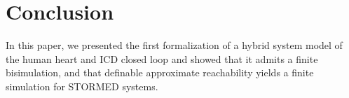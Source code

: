 \section{Conclusion}
In this paper, we presented the first formalization of a hybrid system model of the human heart and \ac{ICD} closed loop and showed that it admits a finite bisimulation, and that definable approximate reachability yields a finite simulation for STORMED systems.